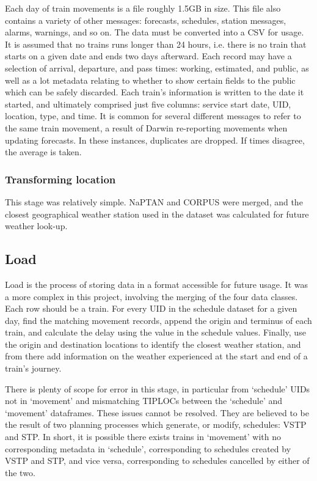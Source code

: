 \documentclass[12pt,a4paper]{article}
\begin{document}
Each day of train movements is a file roughly 1.5GB in size. This file also contains a variety of other messages: forecasts, schedules, station messages, alarms, warnings, and so on. The data must be converted into a CSV for usage. It is assumed that no trains runs longer than 24 hours, i.e. there is no train that starts on a given date and ends two days afterward. Each record may have a selection of arrival, departure, and pass times: working, estimated, and public, as well as a lot metadata relating to whether to show certain fields to the public which can be safely discarded. Each train’s information is written to the date it started, and ultimately comprised just five columns: service start date, UID, location, type, and time. It is common for several different messages to refer to the same train movement, a result of Darwin re-reporting movements when updating forecasts. In these instances, duplicates are dropped. If times disagree, the average is taken. 

\subsubsection{Transforming location}

This stage was relatively simple. NaPTAN and CORPUS were merged, and the closest geographical weather station used in the dataset was calculated for future weather look-up. 

\subsection{Load}

Load is the process of storing data in a format accessible for future usage. It was a more complex in this project, involving the merging of the four data classes. Each row should be a train. For every UID in the schedule dataset for a given day, find the matching movement records, append the origin and terminus of each train, and calculate the delay using the value in the schedule values. Finally, use the origin and destination locations to identify the closest weather station, and from there add information on the weather experienced at the start and end of a train’s journey. 

There is plenty of scope for error in this stage, in particular from ‘schedule’ UIDs not in ‘movement’ and mismatching TIPLOCs between the ‘schedule’ and ‘movement’ dataframes. These issues cannot be resolved. They are believed to be the result of two planning processes which generate, or modify, schedules: VSTP and STP. In short, it is possible there exists trains in ‘movement’ with no corresponding metadata in ‘schedule’, corresponding to schedules created by VSTP and STP, and vice versa, corresponding to schedules cancelled by either of the two. 
\end{document}
